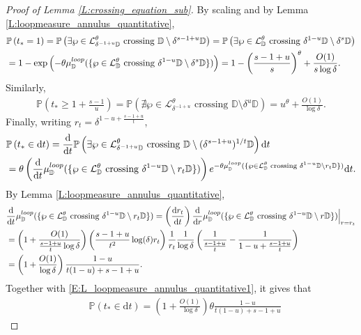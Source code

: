 \documentclass[10pt,a4paper]{amsart}
\def \loopmeasure{\mu^{\rm loop}}
\newcommand{\D}{\mathbb{D}}
\newcommand{\Lc}{\mathcal{L}}
\newcommand{\Prob}[1]{\mathbb{P} \left( #1 \right) }
\renewcommand{\d}{\mathrm{d}}
\begin{document}
\begin{proof}[Proof of Lemma \ref{L:crossing_equation_sub}]
By scaling and by Lemma \ref{L:loopmeasure_annulus_quantitative},
\begin{align*}
& \Prob{t_* = 1} =  \Prob{ \exists \wp \in \Lc_{\delta^{-1+u} \D}^\theta \text{~crossing~} \D \setminus \delta^{s-1+u} \D}
= \Prob{ \exists \wp \in \Lc_{\D}^\theta \text{~crossing~} \delta^{1-u} \D \setminus \delta^s \D} \\
& = 1 - \exp \left( - \theta \loopmeasure_\D (\{\wp \in \Lc_{\D}^\theta \text{~crossing~} \delta^{1-u} \D \setminus \delta^s \D\}) \right)
= 1 - \left( \frac{s-1+u}{s} \right)^\theta + \frac{O(1)}{s \log \delta}.
\end{align*}
Similarly,
\begin{align*}
\Prob{t_* \geq 1 + \frac{s-1}{u} } = \Prob{ \nexists \wp \in \Lc_{\delta^{-1+u}}^\theta \text{~crossing~} \D \setminus \delta^u \D }
= u^\theta + \frac{O(1)}{\log \delta}.
\end{align*}
Finally, writing $r_t = \delta^{1-u + \frac{s-1+u}{t}}$,
\begin{align*}
& \Prob{t_* \in \d t} = \frac{\d}{\d t} \Prob{ \exists \wp \in \Lc_{\delta^{-1+u} \D}^\theta \text{~crossing~} \D \setminus (\delta^{s-1+u})^{1/t} \D} \d t \\
& = \theta \left( \frac{\d}{\d t} \loopmeasure_\D ( \{ \wp \in \Lc_{\D}^\theta \text{~crossing~} \delta^{1-u} \D \setminus r_t \D \} ) \right) e^{ - \theta \loopmeasure_\D ( \{ \wp \in \Lc_{\D}^\theta \text{~crossing~} \delta^{1-u} \D \setminus r_t \D \} ) } \d t.
\end{align*}
By Lemma \ref{L:loopmeasure_annulus_quantitative},
\begin{align*}
& \frac{\d}{\d t} \loopmeasure_\D ( \{ \wp \in \Lc_{\D}^\theta \text{~crossing~} \delta^{1-u} \D \setminus r_t \D \} ) = \left( \frac{\d r_t}{\d t} \right) \frac{\d}{\d r} \loopmeasure_\D ( \{ \wp \in \Lc_{\D}^\theta \text{~crossing~} \delta^{1-u} \D \setminus r \D \} ) \Big\vert_{r = r_t} \\
& = \left( 1 + \frac{O(1)}{\frac{s-1+u}{t} \log \delta} \right)  \left( \frac{s-1+u}{t^2} \log (\delta) r_t \right) \frac{1}{r_t} \frac{1}{\log \delta} \left( \frac{1}{\frac{s-1+u}{t}} - \frac{1}{1-u + \frac{s-1+u}{t}} \right) \\
& = \left( 1 + \frac{O(1)}{\log \delta} \right) \frac{1-u}{t(1-u)+s-1+u}.
\end{align*}
Together with \eqref{E:L_loopmeasure_annulus_quantitative1}, it gives that
\begin{align*}
& \Prob{t_* \in \d t}
= \left( 1 + \frac{O(1)}{\log \delta} \right) \theta \frac{1-u}{t(1-u)+s-1+u}

\end{align*}
\end{proof}
\end{document}
